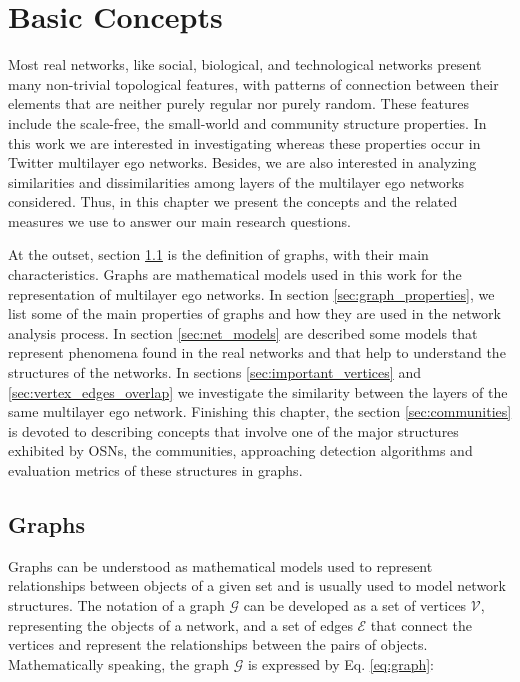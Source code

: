 \chapter{Basic Concepts}
\label{cap:Basic}

Most real networks, like social, biological, and technological networks present many non-trivial topological features, with patterns of connection between their elements that are neither purely regular nor purely random. These features include the scale-free, the small-world and community structure properties. In this work we are interested in investigating whereas these properties occur in Twitter multilayer ego networks. Besides, we are also interested in analyzing similarities and dissimilarities among layers of the multilayer ego networks considered. Thus, in this chapter we present the concepts and the related measures we use to answer our main research questions.

At the outset, section \ref{sec:graphs} is the definition of graphs, with their main characteristics. Graphs are mathematical models used in this work for the representation of multilayer ego networks. In section \ref{sec:graph_properties}, we list some of the main properties of graphs and how they are used in the network analysis process. In section \ref{sec:net_models} are described some models that represent phenomena found in the real networks and that help to understand the structures of the networks. In sections \ref{sec:important_vertices} and \ref{sec:vertex_edges_overlap} we investigate the similarity between the layers of the same multilayer ego network. Finishing this chapter, the section \ref{sec:communities} is devoted to describing concepts that involve one of the major structures exhibited by OSNs, the communities, approaching detection algorithms and evaluation metrics of these structures in graphs.



\section{Graphs}
\label{sec:graphs}

Graphs can be understood as mathematical models used to represent relationships between objects of a given set and is usually used to model network structures. The notation of a graph $\mathcal{G}$ can be developed as a set of vertices $\mathcal{V}$, representing the objects of a network, and a set of edges $\mathcal{E}$ that connect the vertices and represent the relationships between the pairs of objects. Mathematically speaking, the graph $\mathcal{G}$ is expressed by Eq. \ref{eq:graph}:

